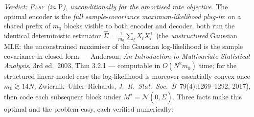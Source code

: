 \documentclass[
]{article}
\begin{document}
\emph{Verdict: \textsc{Easy} (in $\mathrm P$), unconditionally for the
amortised rate objective.} The optimal encoder is the \emph{full
sample-covariance maximum-likelihood plug-in}: on a shared prefix of $m_0$
blocks visible to both encoder and decoder, both run the identical
deterministic estimator $\hat\Sigma=\frac1{m_0}\sum_i X_iX_i^\top$ (the
\emph{unstructured} Gaussian MLE: the unconstrained maximiser of the Gaussian
log-likelihood is the sample covariance in closed form --- Anderson,
\emph{An Introduction to Multivariate Statistical Analysis}, 3rd ed.\ 2003,
Thm 3.2.1 --- computable in $O(N^2m_0)$ time; for the structured linear-model
case the log-likelihood is moreover essentially convex once $m_0\gtrsim 14N$,
Zwiernik--Uhler--Richards, \emph{J.\ R.\ Stat.\ Soc.\ B}\ 79(4):1269--1292,
2017), then code each subsequent block under $M^\star=\mathcal N(0,\hat\Sigma)$. Three facts make this optimal and the
problem easy, each verified numerically:
\end{document}

